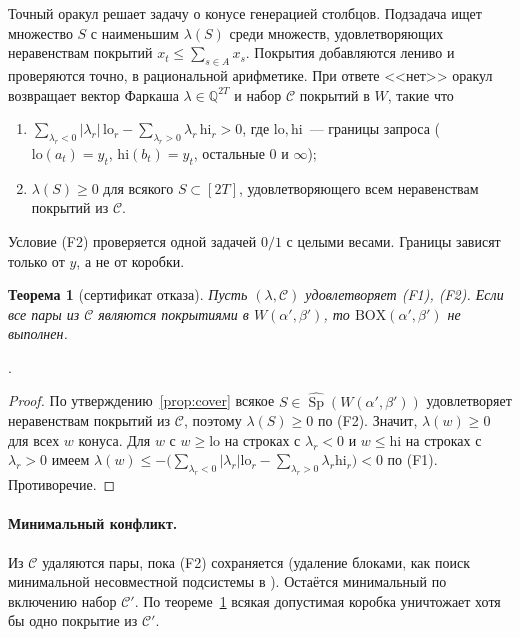 \documentclass[a4paper,11pt]{article}
\newcommand{\lean}[1]{\mbox{\path{#1}}}
\theoremstyle{plain}
\newtheorem{theorem}{Теорема}[section]
\theoremstyle{definition}
\theoremstyle{remark}
\newcommand{\abs}[1]{\left\lvert #1 \right\rvert}
\DeclareMathOperator{\Sp}{Sp}
\newcommand{\BOX}{\mathrm{BOX}}
\begin{document}
Точный оракул решает задачу о конусе генерацией столбцов. Подзадача ищет множество $S$ с наименьшим $\lambda(S)$ среди множеств, удовлетворяющих неравенствам покрытий $x_t\le\sum_{s\in A}x_s$. Покрытия добавляются лениво и проверяются точно, в рациональной арифметике. При ответе <<нет>> оракул возвращает вектор Фаркаша $\lambda\in\mathbb Q^{2T}$ и набор $\mathcal C$ покрытий в $W$, такие что
\begin{enumerate}[label=(F\arabic*)]
    \item $\sum_{\lambda_r<0}\abs{\lambda_r}\,\mathrm{lo}_r-\sum_{\lambda_r>0}\lambda_r\,\mathrm{hi}_r>0$, где $\mathrm{lo},\mathrm{hi}$~--- границы запроса ($\mathrm{lo}(a_t)=y_t$, $\mathrm{hi}(b_t)=y_t$, остальные $0$ и $\infty$);
    \item $\lambda(S)\ge0$ для всякого $S\subset[2T]$, удовлетворяющего всем неравенствам покрытий из $\mathcal C$.
\end{enumerate}
Условие (F2) проверяется одной задачей $0/1$ с целыми весами. Границы зависят только от $y$, а не от коробки.

\begin{theorem}[сертификат отказа]\label{thm:certificate}
    Пусть $(\lambda,\mathcal C)$ удовлетворяет (F1), (F2). Если все пары из $\mathcal C$ являются покрытиями в $W(\alpha',\beta')$, то $\BOX(\alpha',\beta')$ не выполнен.
\end{theorem}

\lean{not_boxCone_of_certificate}.

\begin{proof}
    По утверждению~\ref{prop:cover} всякое $S\in\widehat{\Sp}(W(\alpha',\beta'))$ удовлетворяет неравенствам покрытий из $\mathcal C$, поэтому $\lambda(S)\ge0$ по (F2). Значит, $\lambda(w)\ge0$ для всех $w$ конуса. Для $w$ с $w\ge\mathrm{lo}$ на строках с $\lambda_r<0$ и $w\le\mathrm{hi}$ на строках с $\lambda_r>0$ имеем $\lambda(w)\le-\bigl(\sum_{\lambda_r<0}\abs{\lambda_r}\mathrm{lo}_r-\sum_{\lambda_r>0}\lambda_r\mathrm{hi}_r\bigr)<0$ по (F1). Противоречие.
\end{proof}

\paragraph{Минимальный конфликт.} Из $\mathcal C$ удаляются пары, пока (F2) сохраняется (удаление блоками, как поиск минимальной несовместной подсистемы в \cite{CodatoFischetti2006}). Остаётся минимальный по включению набор $\mathcal C'$. По теореме~\ref{thm:certificate} всякая допустимая коробка уничтожает хотя бы одно покрытие из $\mathcal C'$.
\end{document}
